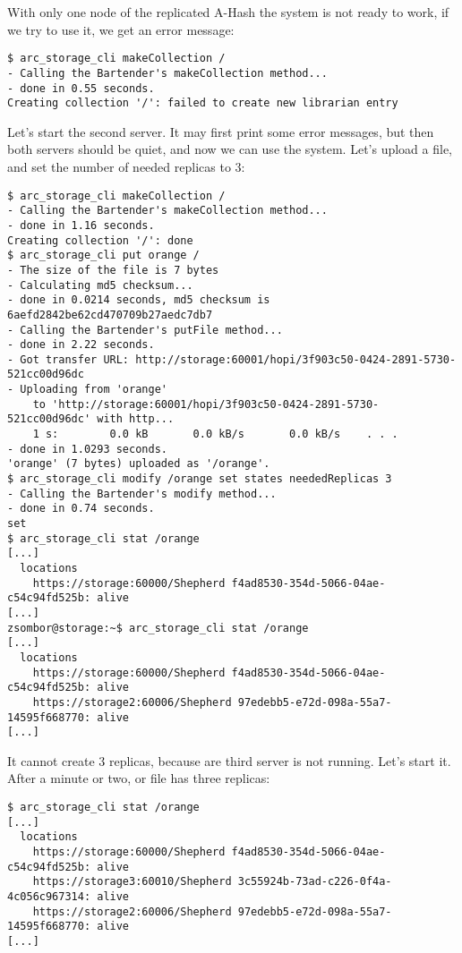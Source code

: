 \documentclass{book}
\begin{document}
With only one node of the replicated A-Hash the system is not ready to work, if we try to use it, we get an error message:
\begin{verbatim}
$ arc_storage_cli makeCollection /
- Calling the Bartender's makeCollection method...
- done in 0.55 seconds.
Creating collection '/': failed to create new librarian entry
\end{verbatim}

Let's start the second server. It may first print some error messages, but then both servers should be quiet, and now we can use the system. Let's upload a file, and set the number of needed replicas to 3:

\begin{verbatim}
$ arc_storage_cli makeCollection /
- Calling the Bartender's makeCollection method...
- done in 1.16 seconds.
Creating collection '/': done
$ arc_storage_cli put orange /
- The size of the file is 7 bytes
- Calculating md5 checksum...
- done in 0.0214 seconds, md5 checksum is 6aefd2842be62cd470709b27aedc7db7
- Calling the Bartender's putFile method...
- done in 2.22 seconds.
- Got transfer URL: http://storage:60001/hopi/3f903c50-0424-2891-5730-521cc00d96dc
- Uploading from 'orange'
    to 'http://storage:60001/hopi/3f903c50-0424-2891-5730-521cc00d96dc' with http...
    1 s:        0.0 kB       0.0 kB/s       0.0 kB/s    . . .       
- done in 1.0293 seconds.
'orange' (7 bytes) uploaded as '/orange'.
$ arc_storage_cli modify /orange set states neededReplicas 3
- Calling the Bartender's modify method...
- done in 0.74 seconds.
set
$ arc_storage_cli stat /orange
[...]
  locations
    https://storage:60000/Shepherd f4ad8530-354d-5066-04ae-c54c94fd525b: alive
[...]
zsombor@storage:~$ arc_storage_cli stat /orange
[...]
  locations
    https://storage:60000/Shepherd f4ad8530-354d-5066-04ae-c54c94fd525b: alive
    https://storage2:60006/Shepherd 97edebb5-e72d-098a-55a7-14595f668770: alive
[...]    
\end{verbatim}

It cannot create 3 replicas, because are third server is not running. Let's start it. After a minute or two, or file has three replicas:

\begin{verbatim}
$ arc_storage_cli stat /orange
[...]
  locations
    https://storage:60000/Shepherd f4ad8530-354d-5066-04ae-c54c94fd525b: alive
    https://storage3:60010/Shepherd 3c55924b-73ad-c226-0f4a-4c056c967314: alive
    https://storage2:60006/Shepherd 97edebb5-e72d-098a-55a7-14595f668770: alive
[...]
\end{verbatim}
\end{document}
